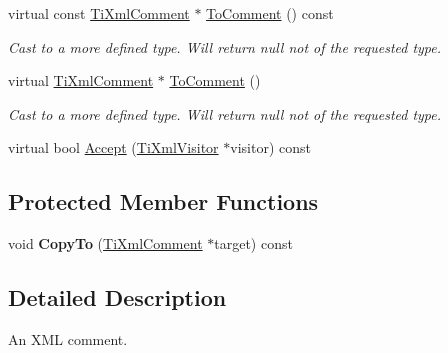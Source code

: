 \begin{DoxyCompactItemize}
\item 
\hypertarget{classTiXmlComment_a00fb4215c20a2399ea05ac9b9e7e68a0}{
virtual const \hyperlink{classTiXmlComment}{\-Ti\-Xml\-Comment} $\ast$ \hyperlink{classTiXmlComment_a00fb4215c20a2399ea05ac9b9e7e68a0}{\-To\-Comment} () const }
\label{de/d43/classTiXmlComment_a00fb4215c20a2399ea05ac9b9e7e68a0}

\begin{DoxyCompactList}\small\item\em \-Cast to a more defined type. \-Will return null not of the requested type. \end{DoxyCompactList}\item 
\hypertarget{classTiXmlComment_acc7c7e07e13c23f17797d642981511df}{
virtual \hyperlink{classTiXmlComment}{\-Ti\-Xml\-Comment} $\ast$ \hyperlink{classTiXmlComment_acc7c7e07e13c23f17797d642981511df}{\-To\-Comment} ()}
\label{de/d43/classTiXmlComment_acc7c7e07e13c23f17797d642981511df}

\begin{DoxyCompactList}\small\item\em \-Cast to a more defined type. \-Will return null not of the requested type. \end{DoxyCompactList}\item 
virtual bool \hyperlink{classTiXmlComment_a4382de0e50da973f11a23ea5852568bd}{\-Accept} (\hyperlink{classTiXmlVisitor}{\-Ti\-Xml\-Visitor} $\ast$visitor) const 
\end{DoxyCompactItemize}
\subsection*{\-Protected \-Member \-Functions}
\begin{DoxyCompactItemize}
\item 
\hypertarget{classTiXmlComment_a3175b2f27628f4fb7a043897930cd934}{
void {\bfseries \-Copy\-To} (\hyperlink{classTiXmlComment}{\-Ti\-Xml\-Comment} $\ast$target) const }
\label{de/d43/classTiXmlComment_a3175b2f27628f4fb7a043897930cd934}

\end{DoxyCompactItemize}


\subsection{\-Detailed \-Description}
\-An \-X\-M\-L comment. 

